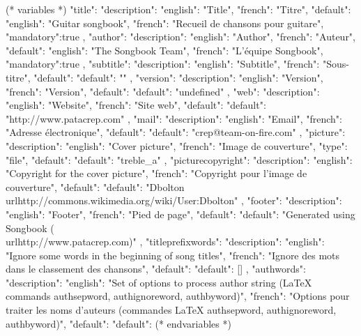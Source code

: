 

(* variables *)
{
"title": {"description": {"english": "Title", "french": "Titre"},
            "default": {"english": "Guitar songbook", "french": "Recueil de chansons pour guitare"},
            "mandatory":true
         },
"author": {"description": {"english": "Author", "french": "Auteur"},
            "default": {"english": "The Songbook Team", "french": "L'équipe Songbook"},
            "mandatory":true
         },
"subtitle": {"description": {"english": "Subtitle", "french": "Sous-titre"},
            "default": {"default": ""}
            },
"version":{ "description": {"english": "Version", "french": "Version"},
            "default": {"default": "undefined"}
         },
"web": {"description": {"english": "Website", "french": "Site web"},
         "default": {"default": "http://www.patacrep.com"}
      },
"mail": {"description": {"english": "Email", "french": "Adresse électronique"},
         "default": {"default": "crep@team-on-fire.com"}
      },
"picture": {"description": {"english": "Cover picture", "french": "Image de couverture"},
            "type": "file",
            "default": {"default": "treble_a"}
         },
"picturecopyright": {"description": {"english": "Copyright for the cover picture", "french": "Copyright pour l'image de couverture"},
                     "default": {"default": "Dbolton \\url{http://commons.wikimedia.org/wiki/User:Dbolton}"}
                  },
"footer": {"description": {"english": "Footer", "french": "Pied de page"},
           "default": {"default": "Generated using Songbook (\\url{http://www.patacrep.com})"}
        },
"titleprefixwords": {"description": {"english": "Ignore some words in the beginning of song titles",
                                     "french": "Ignore des mots dans le classement des chansons"},
                     "default": {"default": []}
                     },
"authwords": {"description": {"english": "Set of options to process author string (LaTeX commands authsepword, authignoreword, authbyword)",
                              "french": "Options pour traiter les noms d'auteurs (commandes LaTeX authsepword, authignoreword, authbyword)"},
               "default": {"default": {}}
               }
}
(* endvariables *)

